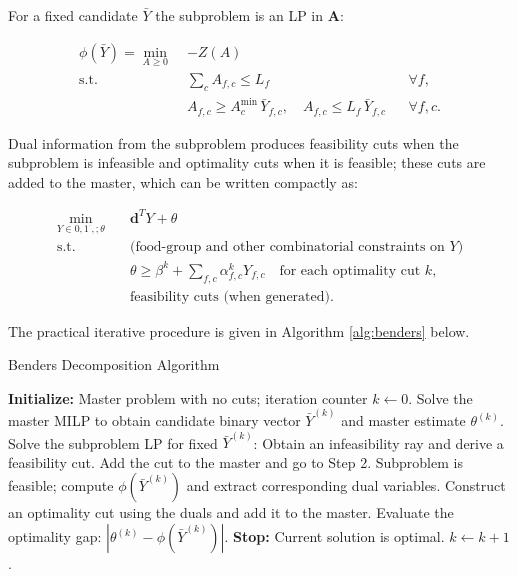 For a fixed candidate $\bar Y$ the subproblem is an LP in $\mathbf{A}$:

\begin{align}
\phi(\bar Y) = \min_{A \ge 0}\; & -Z(A) \\
\text{s.t.}\quad
& \sum_{c} A_{f,c} \le L_f && \forall f, \\
& A_{f,c} \ge A^{\min}_c\,\bar Y_{f,c}, \quad
  A_{f,c} \le L_f\,\bar Y_{f,c} && \forall f,c.
\end{align}


Dual information from the subproblem produces feasibility cuts when the subproblem is infeasible and optimality cuts when it is feasible; these cuts are added to the master, which can be written compactly as:

\begin{equation}
\begin{aligned}
\min_{Y \in {0,1}^{\cdot},;\theta} \quad
& \mathbf{d}^T Y + \theta \\
\text{s.t.}\quad
& \text{(food-group and other combinatorial constraints on $Y$)} \\
& \theta \ge \beta^k + \sum_{f,c} \alpha^k_{f,c} Y_{f,c}
\quad \text{for each optimality cut }k, \\
& \text{feasibility cuts (when generated).}
\end{aligned}
\end{equation}

The practical iterative procedure is given in Algorithm \ref{alg:benders} below.
\begin{algorithm}[H]
\caption{Benders Decomposition Algorithm}
\label{alg:benders}
\begin{algorithmic}[1]
\State \textbf{Initialize:} Master problem with no cuts; iteration counter $k \gets 0$.
\Repeat
\State Solve the master MILP to obtain candidate binary vector $\bar{Y}^{(k)}$ and master estimate $\theta^{(k)}$.
\State Solve the subproblem LP for fixed $\bar{Y}^{(k)}$:
\State Obtain an infeasibility ray and derive a feasibility cut.
\State Add the cut to the master and go to Step 2.
\Else
\State Subproblem is feasible; compute $\phi(\bar{Y}^{(k)})$ and extract corresponding dual variables.
\State Construct an optimality cut using the duals and add it to the master.
\EndIf
\State Evaluate the optimality gap: $|\theta^{(k)} - \phi(\bar{Y}^{(k)})|$.
\State \textbf{Stop:} Current solution is optimal.
\Else
\State $k \gets k + 1$.
\EndIf
{}
\end{algorithmic}
\end{algorithm}



